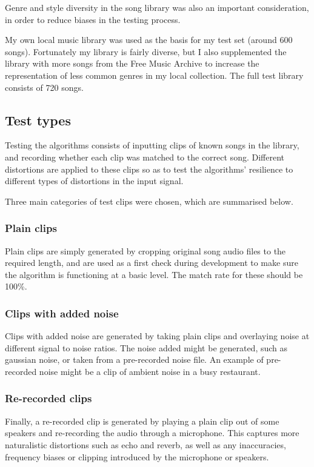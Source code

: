 \documentclass[12pt,a4paper,twoside,openright]{report}
\begin{document}
Genre and style diversity in the song library was also an important consideration, in order to reduce biases in the testing process.

My own local music library was used as the basis for my test set (around 600 songs). Fortunately my library is fairly diverse, but I also supplemented the library with more songs from the Free Music Archive to increase the representation of less common genres in my local collection. The full test library consists of 720 songs.

\subsection{Test types}

Testing the algorithms consists of inputting clips of known songs in the library, and recording whether each clip was matched to the correct song. Different distortions are applied to these clips so as to test the algorithms' resilience to different types of distortions in the input signal.

Three main categories of test clips were chosen, which are summarised below.

\subsubsection{Plain clips}

Plain clips are simply generated by cropping original song audio files to the required length, and are used as a first check during development to make sure the algorithm is functioning at a basic level. The match rate for these should be 100\%.

\subsubsection{Clips with added noise}

Clips with added noise are generated by taking plain clips and overlaying noise at different signal to noise ratios. The noise added might be generated, such as gaussian noise, or taken from a pre-recorded noise file. An example of pre-recorded noise might be a clip of ambient noise in a busy restaurant.

\subsubsection{Re-recorded clips}

Finally, a re-recorded clip is generated by playing a plain clip out of some speakers and re-recording the audio through a microphone. This captures more naturalistic distortions such as echo and reverb, as well as any inaccuracies, frequency biases or clipping introduced by the microphone or speakers.
\end{document}
